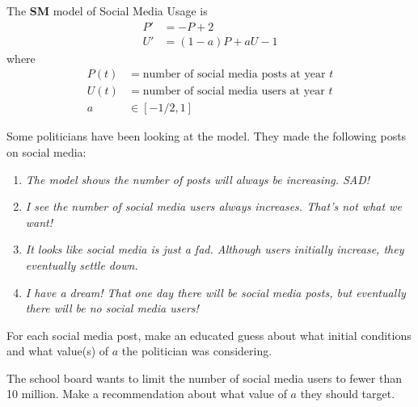 \documentclass{workbook}
\begin{document}
\begin{slide}
	\question
	The \textbf{SM} model of Social Media Usage is
	\begin{align*}
		P'&=-P+2\\
		U'&=(1-a)P + aU - 1
	\end{align*}
	where
	\begin{align*}
		P(t) &= \text{number of social media posts at year $t$}\\
		U(t) &= \text{number of social media users at year $t$}\\
		a &\in [-1/2, 1]
	\end{align*}

	Some politicians have been looking at the model. They made the following posts on social media:
	\begin{enumerate}
			\item \emph{The model shows the number of posts will always be increasing. SAD!}
			\item \emph{I see the number of social media users always increases. That's not what we want!}
			\item \emph{It looks like social media is just a fad. Although users initially increase, they eventually settle down.}
			\item \emph{I have a dream! That one day there will be social media posts, but eventually there will be no social media users!}
	\end{enumerate}
		
	\begin{parts}
		\item For each social media post, make an educated guess about what initial conditions and what
		value(s) of $a$ the politician was considering.
		\item The school board wants to limit the number of social media users to fewer than 10 million.
		Make a recommendation about what value of $a$ they should target.
	\end{parts}
\end{slide}

%
%
\end{document}
